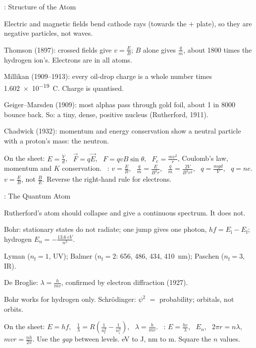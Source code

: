 \begin{summarybox}[fontupper=\small]{: Structure of the Atom}
\begin{sumlist}
  \item Electric and magnetic fields bend cathode rays (towards the $+$ plate), so they
        are negative particles, not waves.
  \item Thomson (1897): crossed fields give $v = \frac{E}{B}$; $B$ alone gives
        $\frac{q}{m}$, about 1800 times the hydrogen ion's. Electrons are in all atoms.
  \item Millikan (1909--1913): every oil-drop charge is a whole number times
        \qty{1.602e-19}{C}. Charge is quantised.
  \item Geiger--Marsden (1909): most alphas pass through gold foil, about 1 in 8000
        bounce back. So: a tiny, dense, positive nucleus (Rutherford, 1911).
  \item Chadwick (1932): momentum and energy conservation show a neutral particle with a
        proton's mass: the neutron.
\end{sumlist}
 On the sheet: $E = \frac{V}{d}$, \ $\vec{F} = q\vec{E}$, \
$F = qvB\sin\theta$, \ $F_\mathrm{c} = \frac{mv^2}{r}$, Coulomb's law, momentum and $K$
conservation. \ \sumLearn: $v = \frac{E}{B}$, \ $\frac{q}{m} = \frac{E}{B^2 r}$, \
$\frac{q}{m} = \frac{2V}{B^2 r^2}$, \ $q = \frac{mgd}{V}$, \ $q = ne$.
\sumhead{Traps} $v = \frac{E}{B}$, not $\frac{B}{E}$. Reverse the right-hand rule for
electrons.
\end{summarybox}

\begin{summarybox}[fontupper=\small]{: The Quantum Atom}
\begin{sumlist}
  \item Rutherford's atom should collapse and give a continuous spectrum. It does not.
  \item Bohr: stationary states do not radiate; one jump gives one photon,
        $hf = E_\mathrm{i} - E_\mathrm{f}$; hydrogen $E_n = -\frac{\qty{13.6}{eV}}{n^2}$.
  \item Lyman ($n_\mathrm{f} = 1$, UV); Balmer ($n_\mathrm{f} = 2$: 656, 486, 434,
        \qty{410}{nm}); Paschen ($n_\mathrm{f} = 3$, IR).
  \item De Broglie: $\lambda = \frac{h}{mv}$, confirmed by electron diffraction (1927).
  \item Bohr works for hydrogen only. Schr\"odinger: $\psi^2$ $=$ probability; orbitals,
        not orbits.
\end{sumlist}
 On the sheet: $E = hf$, \ $\frac{1}{\lambda} =
R\left(\frac{1}{n_\mathrm{f}^2} - \frac{1}{n_\mathrm{i}^2}\right)$, \
$\lambda = \frac{h}{mv}$. \ \sumLearn: $E = \frac{hc}{\lambda}$, \ $E_n$, \
$2\pi r = n\lambda$, \ $mvr = \frac{nh}{2\pi}$.
\sumhead{Traps} Use the \emph{gap} between levels. eV to J, nm to m. Square the $n$
values.
\end{summarybox}

